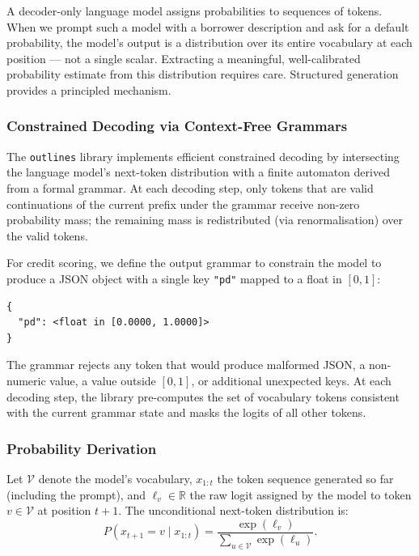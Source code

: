 \begin{context}
A decoder-only language model assigns probabilities to sequences of tokens. When we prompt such a model with a borrower description and ask for a default probability, the model's output is a distribution over its entire vocabulary at each position --- not a single scalar. Extracting a meaningful, well-calibrated probability estimate from this distribution requires care. Structured generation provides a principled mechanism.

\subsubsection*{Constrained Decoding via Context-Free Grammars}

The \texttt{outlines} library \cite{willard2023efficient} implements efficient constrained decoding by intersecting the language model's next-token distribution with a finite automaton derived from a formal grammar. At each decoding step, only tokens that are valid continuations of the current prefix under the grammar receive non-zero probability mass; the remaining mass is redistributed (via renormalisation) over the valid tokens.

For credit scoring, we define the output grammar to constrain the model to produce a JSON object with a single key \texttt{"pd"} mapped to a float in $[0, 1]$:

\begin{verbatim}
{
  "pd": <float in [0.0000, 1.0000]>
}
\end{verbatim}

The grammar rejects any token that would produce malformed JSON, a non-numeric value, a value outside $[0, 1]$, or additional unexpected keys. At each decoding step, the library pre-computes the set of vocabulary tokens consistent with the current grammar state and masks the logits of all other tokens.

\subsubsection*{Probability Derivation}

Let $\mathcal{V}$ denote the model's vocabulary, $x_{1:t}$ the token sequence generated so far (including the prompt), and $\ell_v \in \mathbb{R}$ the raw logit assigned by the model to token $v \in \mathcal{V}$ at position $t+1$. The unconditional next-token distribution is:
\begin{equation}
  P(x_{t+1} = v \mid x_{1:t}) = \frac{\exp(\ell_v)}{\sum_{u \in \mathcal{V}} \exp(\ell_u)}.
  \label{eq:softmax}
\end{equation}


\end{context}
